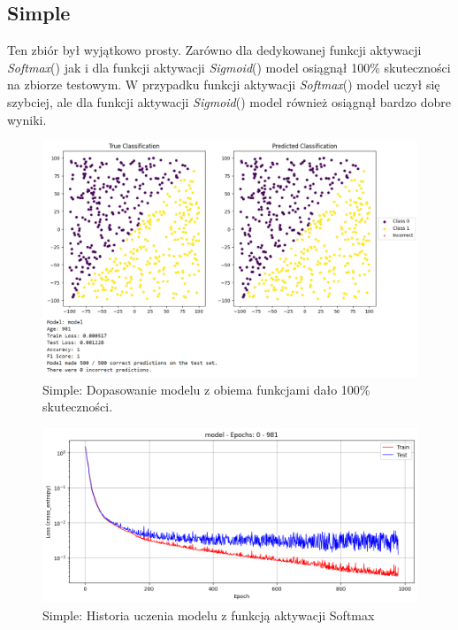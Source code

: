 \documentclass{article}
\begin{document}
\subsection*{Simple}
Ten zbiór był wyjątkowo prosty. Zarówno dla dedykowanej funkcji aktywacji \textit{Softmax}() jak i dla funkcji aktywacji \textit{Sigmoid}() model osiągnął 100\% skuteczności na zbiorze testowym. W przypadku funkcji aktywacji \textit{Softmax}() model uczył się szybciej, ale dla funkcji aktywacji \textit{Sigmoid}() model również osiągnął bardzo dobre wyniki.
\begin{figure}[H]
    \centering
    \includegraphics[width=\textwidth]{img/nn4/easy_fit.png}
    \caption{Simple: Dopasowanie modelu z obiema funkcjami dało 100\% skuteczności.} 
\end{figure}
\begin{figure}[H]
    \centering
    \includegraphics[width=\textwidth]{img/nn4/easy_history.png}
    \caption{Simple: Historia uczenia modelu z funkcją aktywacji Softmax} 
\end{figure}
\newpage
\end{document}
